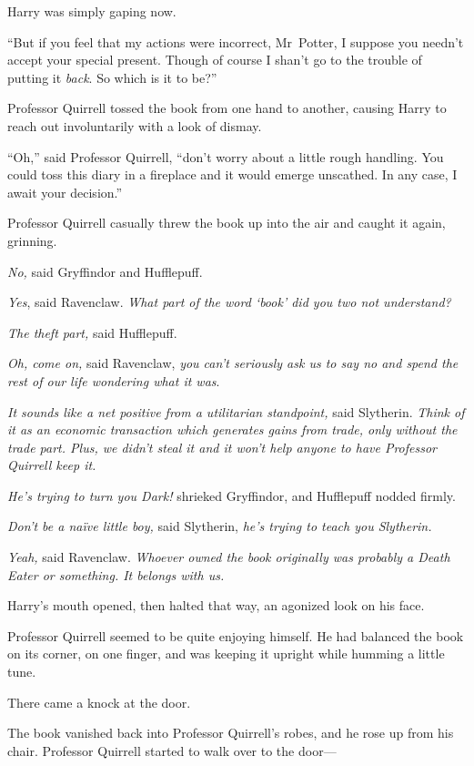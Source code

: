 Harry was simply gaping now.

“But if you feel that my actions were incorrect, Mr~Potter, I suppose you needn’t accept your special present. Though of course I shan’t go to the trouble of putting it \emph{back}. So which is it to be?”

Professor Quirrell tossed the book from one hand to another, causing Harry to reach out involuntarily with a look of dismay.

“Oh,” said Professor Quirrell, “don’t worry about a little rough handling. You could toss this diary in a fireplace and it would emerge unscathed. In any case, I await your decision.”

Professor Quirrell casually threw the book up into the air and caught it again, grinning.

\emph{No,} said Gryffindor and Hufflepuff.

\emph{Yes}, said Ravenclaw. \emph{What part of the word ‘book’ did you two not understand?}

\emph{The theft part,} said Hufflepuff.

\emph{Oh, come on,} said Ravenclaw, \emph{you can’t seriously ask us to say no and spend the rest of our life wondering what it was}.

\emph{It sounds like a net positive from a utilitarian standpoint,} said Slytherin. \emph{Think of it as an economic transaction which generates gains from trade, only without the trade part. Plus, \emph{we} didn’t steal it and it won’t help anyone to have Professor Quirrell keep it.}

\emph{He’s trying to turn you Dark!} shrieked Gryffindor, and Hufflepuff nodded firmly.

\emph{Don’t be a naïve little boy,} said Slytherin, \emph{he’s trying to teach you Slytherin.}

\emph{Yeah,} said Ravenclaw. \emph{Whoever owned the book originally was probably a Death Eater or something. It belongs with us.}

Harry’s mouth opened, then halted that way, an agonized look on his face.

Professor Quirrell seemed to be quite enjoying himself. He had balanced the book on its corner, on one finger, and was keeping it upright while humming a little tune.

There came a knock at the door.

The book vanished back into Professor Quirrell’s robes, and he rose up from his chair. Professor Quirrell started to walk over to the door—


